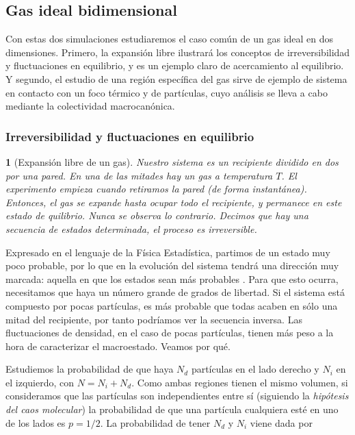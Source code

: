 \documentclass[11pt, a4paper]{article} %
\theoremstyle{named}
\newtheorem*{namedtheorem}{}
\begin{document}
\subsection{Gas ideal bidimensional}\label{sec:gases}

Con estas dos simulaciones estudiaremos el caso común de un gas ideal en dos dimensiones. Primero, la expansión libre ilustrará los conceptos de irreversibilidad y fluctuaciones en equilibrio, y es un ejemplo claro de acercamiento al equilibrio. Y segundo, el estudio de una región específica del gas sirve de ejemplo de sistema en contacto con un foco térmico y de partículas, cuyo análisis se lleva a cabo mediante la colectividad macrocanónica.

\subsubsection{Irreversibilidad y fluctuaciones en equilibrio}\label{sec:equilibrio}

\begin{namedtheorem}[Expansión libre de un gas] Nuestro sistema es un recipiente dividido en dos por una pared. En una de las mitades hay un gas a temperatura $T$. El experimento empieza cuando retiramos la pared (de forma instantánea). Entonces, el gas se expande hasta ocupar todo el recipiente, y permanece en este estado de quilibrio. Nunca se observa lo contrario. Decimos que hay una secuencia de estados determinada, el proceso es irreversible.
\end{namedtheorem}

Expresado en el lenguaje de la Física Estadística, partimos de un estado muy poco probable, por lo que en la evolución del sistema tendrá una dirección muy marcada: aquella en que los estados sean más probables \cite{huang}. Para que esto ocurra, necesitamos que haya un número grande de grados de libertad. Si el sistema está compuesto por pocas partículas, es más probable que todas acaben en sólo una mitad del recipiente, por tanto podríamos ver la secuencia inversa. Las fluctuaciones de densidad, en el caso de pocas partículas, tienen más peso a la hora de caracterizar el macroestado.
Veamos por qué.

Estudiemos la probabilidad de que haya $N_d$ partículas en el lado derecho y $N_i$ en el izquierdo, con $N = N_i + N_d$. Como ambas regiones tienen el mismo volumen, si consideramos que las partículas son independientes entre sí (siguiendo la \textit{hipótesis del caos molecular}) la probabilidad de que una partícula cualquiera esté en uno de los lados es $p={1/2}$. La probabilidad de tener $N_d$ y $N_i$ viene dada por
\end{document}
